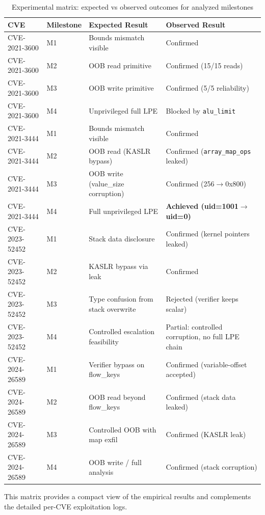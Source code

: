 \begin{table}[H]
\centering
\small
\begin{tabularx}{\textwidth}{@{}llXX@{}}
\toprule
\textbf{CVE} & \textbf{Milestone} & \textbf{Expected Result} & \textbf{Observed Result} \\
\midrule
CVE-2021-3600 & M1 & Bounds mismatch visible & Confirmed \\
CVE-2021-3600 & M2 & OOB read primitive & Confirmed (15/15 reads) \\
CVE-2021-3600 & M3 & OOB write primitive & Confirmed (5/5 reliability) \\
CVE-2021-3600 & M4 & Unprivileged full LPE & Blocked by \texttt{alu\_limit} \\
\midrule
CVE-2021-3444 & M1 & Bounds mismatch visible & Confirmed \\
CVE-2021-3444 & M2 & OOB read (KASLR bypass) & Confirmed (\texttt{array\_map\_ops} leaked) \\
CVE-2021-3444 & M3 & OOB write (value\_size corruption) & Confirmed (256$\rightarrow$0x800) \\
CVE-2021-3444 & M4 & Full unprivileged LPE & \textbf{Achieved (uid=1001$\rightarrow$uid=0)} \\
\midrule
CVE-2023-52452 & M1 & Stack data disclosure & Confirmed (kernel pointers leaked) \\
CVE-2023-52452 & M2 & KASLR bypass via leak & Confirmed \\
CVE-2023-52452 & M3 & Type confusion from stack overwrite & Rejected (verifier keeps scalar) \\
CVE-2023-52452 & M4 & Controlled escalation feasibility & Partial: controlled corruption, no full LPE chain \\
\midrule
CVE-2024-26589 & M1 & Verifier bypass on flow\_keys & Confirmed (variable-offset accepted) \\
CVE-2024-26589 & M2 & OOB read beyond flow\_keys & Confirmed (stack data leaked) \\
CVE-2024-26589 & M3 & Controlled OOB with map exfil & Confirmed (KASLR leak) \\
CVE-2024-26589 & M4 & OOB write / full analysis & Confirmed (stack corruption) \\
\bottomrule
\end{tabularx}
\caption{Experimental matrix: expected vs observed outcomes for analyzed milestones}
\end{table}

This matrix provides a compact view of the empirical results and complements the detailed per-CVE exploitation logs.

